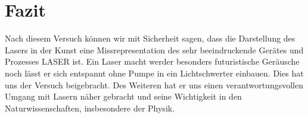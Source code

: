 

\chapter{Fazit}
\label{chap:fazit}

Nach diesem Versuch können wir mit Sicherheit sagen, dass die Darstellung des Lasers in der Kunst eine Missrepresentation
des sehr beeindruckende Gerätes und Prozesses LASER ist. Ein Laser macht werder besonders futuristische Geräusche noch 
lässt er sich entspannt ohne Pumpe in ein Lichtschwerter einbauen. Dies hat uns der Versuch beigebracht. Des Weiteren hat
er uns einen verantwortungsvollen Umgang mit Lasern näher gebracht und seine Wichtigkeit in den Naturwissenschaften, insbesondere der Physik.